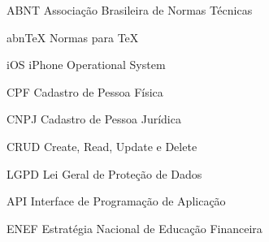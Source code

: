 \documentclass[
	12pt,					%
	openright,				%
	oneside,					%
	a4paper,					%
	english,					%
	portuguese					%
	]{abntex2}
\begin{document}
\frenchspacing


\pretextual









\setcounter{page}{1}




%







\listoffigures*                 
\cleardoublepage

\listoftables*
\cleardoublepage

\begin{siglas}
  \item [ABNT] Associação Brasileira de Normas Técnicas
  \item [abnTeX] Normas para TeX
  \item [iOS] iPhone Operational System
  \item [CPF] Cadastro de Pessoa Física
  \item [CNPJ] Cadastro de Pessoa Jurídica
  \item [CRUD] Create, Read, Update e Delete
  \item [LGPD] Lei Geral de Proteção de Dados
  \item [API] Interface de Programação de Aplicação
  \item [ENEF] Estratégia Nacional de Educação Financeira
\end{siglas}
\end{document}
